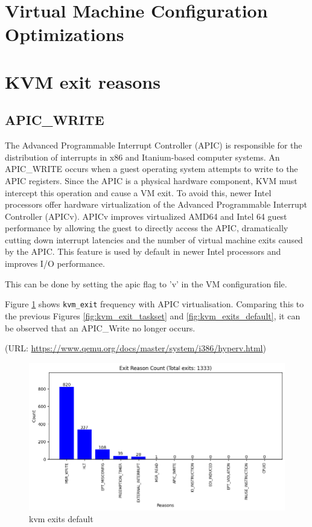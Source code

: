\documentclass[MMR,Master,english]{twbook}
\begin{document}
\section{Virtual Machine Configuration Optimizations}

\clearpage

\section{KVM exit reasons}\label{sec:kvm_exit_reasons}

\subsection{APIC\_WRITE}

The Advanced Programmable Interrupt Controller (APIC) is responsible for the distribution of interrupts in x86 and Itanium-based computer systems. An APIC\_WRITE occurs when a guest operating system attempts to write to the APIC registers. Since the APIC is a physical hardware component, KVM must intercept this operation and cause a VM exit. To avoid this, newer Intel processors offer hardware virtualization of the Advanced Programmable Interrupt Controller (APICv). APICv improves virtualized AMD64 and Intel 64 guest performance by allowing the guest to directly access the APIC, dramatically cutting down interrupt latencies and the number of virtual machine exits caused by the APIC. This feature is used by default in newer Intel processors and improves I/O performance. 

This can be done by setting the apic flag to 'v' in the VM configuration file.

Figure \ref{fig:kvm_exit_vapic} shows \texttt{kvm\_exit} frequency with APIC virtualisation. Comparing this to the previous Figures \ref{fig:kvm_exit_taskset} and \ref{fig:kvm_exits_default}, it can be observed that an APIC\_Write no longer occurs.


(URL: \url{https://www.qemu.org/docs/master/system/i386/hyperv.html})


\begin{figure}[H]
	\centering
	\includegraphics[width=1.0\columnwidth]{img/kvm_exit_vapic.png}
	\caption[kvm exits default]{kvm exits default}
	\label{fig:kvm_exit_vapic}
\end{figure}
\clearpage
\end{document}
